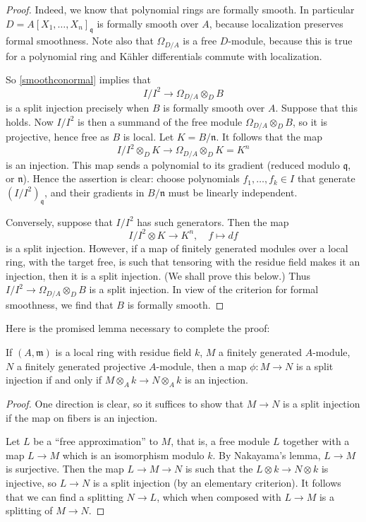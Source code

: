 \begin{proof} 
Indeed, we know that polynomial rings are formally smooth. 
In particular $D = A[X_1, \dots, X_n]_{\mathfrak{q}}$ is formally smooth over
$A$, because localization preserves formal smoothness.  Note also that $\Omega_{D/A}$ is a free $D$-module, because
this is true for a polynomial ring and K\"ahler differentials commute with
localization.

So \cref{smoothconormal} implies that
\[ I/I^2 \to \Omega_{D/A} \otimes_D B  \]
is a split injection precisely when $B$ is formally smooth over $A$. Suppose
that this holds.
Now $I/I^2$ is then a summand of the free module $\Omega_{D/A} \otimes_D B$, so it
is projective, hence free as $B$ is local.
Let $K = B/\mathfrak{n}$. It follows that the map
\[ I/I^2 \otimes_D K \to \Omega_{D/A} \otimes_D  K = K^n \]
is an injection. This map sends a polynomial to its gradient (reduced
modulo $\mathfrak{q}$, or $\mathfrak{n}$). Hence the assertion is
clear: choose polynomials $f_1, \dots, f_k \in I$ that generate
$(I/I^2)_{\mathfrak{q}}$, and their gradients in $B/\mathfrak{n}$ must be
linearly independent.

Conversely, suppose that $I/I^2$ has such generators. 
Then the map 
\[ I/I^2 \otimes K \to K^n, \quad f\mapsto df  \]
is a split injection. 
However, if a map of finitely generated modules over a local ring, with the
target free, is such that tensoring with
the residue field makes it an injection, then it is a split injection. (We
shall prove this below.) Thus $I/I^2 \to \Omega_{D/A} \otimes_D B$ is a split
injection. In view
of the criterion for formal smoothness, we find that $B$ is formally smooth.
\end{proof} 

Here is the promised lemma necessary to complete the proof:
\begin{lemma} 
\label{splitinjreduce}
If $(A, \mathfrak{m})$ is a local ring with residue field $k$, $M$ a finitely
generated $A$-module, $N$ a finitely
generated projective $A$-module, then a map
\( \phi: M \to N  \)
is a split injection if and only if
\(M \otimes_A k \to N \otimes_A k  \)
is an injection.
\end{lemma} 
\begin{proof} 
One direction is clear, so it suffices to show that $M \to N$ is a split
injection if the map on fibers is an injection.


Let $L$ be a ``free approximation'' to $M$, that is, a free module $L$ together
with a map $L \to M$ which is an isomorphism modulo $k$. By Nakayama's lemma,
$L \to M$ is surjective.
Then the map
$L \to M \to N$ is such that the $L \otimes k \to N \otimes k$ is injective, so
$L \to N$ is a split injection (by an elementary criterion).
It follows that we can find a splitting $N \to L$, which when composed with $L
\to M$ is a splitting of $M \to N$.
\end{proof}

